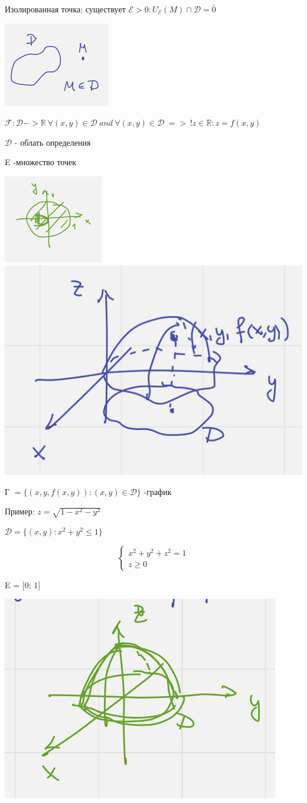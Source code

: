\documentclass{article}
\begin{document}
Изолированная точка: существует $\mathcal{E} > 0 : U^{\cdot}_{\mathcal{E}}(M) \cap \mathcal{D} = \bar{0}$

\includegraphics[width=.3\textwidth]{isolate} 


$\mathcal{F}: \mathcal{D} -> \mathbb{R}\ \forall(x, y) \in \mathcal{D}\ and \ \forall(x, y)\in \mathcal{D}\ =>\ !z \in \mathbb{R}: z = f(x,y)$

$\mathcal{D}$ - облать определения

E -множество точек

\includegraphics[width=.3\textwidth]{ddd} 
\includegraphics[width=.3\textwidth]{2} 


Г $= \{(x, y, f(x,y)): (x, y) \in \mathcal{D}\}$ -график 

Пример: 
$z = \sqrt{1-x^2-y^2}$

$\mathcal{D} = \{(x, y): x^2 + y ^2 \leq 1\}$


\begin{equation*}
    \begin{cases}
        x^2+y^2+z^2 = 1\\
        z \geq 0
    \end{cases}
\end{equation*}

E = [0; 1]

\includegraphics[width=.3\textwidth]{3} 
\\ \\
\end{document}

